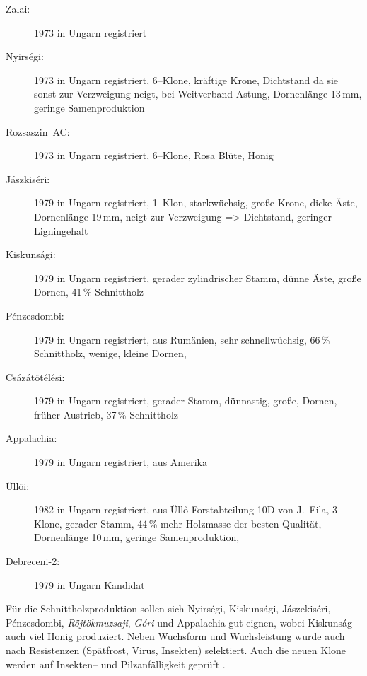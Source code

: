 \documentclass[twocolumn]{scrartcl}
\begin{document}
\begin{description}
  \item[Zalai:] 1973 in Ungarn registriert \citep{keresztesi1983robinie}
  \item[Nyirségi:] 1973 in Ungarn registriert, 6--Klone, kräftige Krone, Dichtstand da sie sonst zur Verzweigung neigt, bei Weitverband Astung, Dornenlänge 13\,mm, geringe Samenproduktion \citep{keresztesi1983robinie,kapusi1995robinie,abri2024dis}
  \item[Rozsaszin~AC:] 1973 in Ungarn registriert, 6--Klone, Rosa Blüte, Honig \citep{keresztesi1983robinie,kapusi1995robinie}
  \item[Jászkiséri:] 1979 in Ungarn registriert, 1--Klon, starkwüchsig, große Krone, dicke Äste, Dornenlänge 19\,mm, neigt zur Verzweigung => Dichtstand, geringer Ligningehalt \citep{keresztesi1983robinie,zsombor1980robinie,kapusi1995robinie,abri2024dis}
  \item[Kiskunsági:] 1979 in Ungarn registriert, gerader zylindrischer Stamm, dünne Äste, große Dornen, 41\,\% Schnittholz \citep{keresztesi1983robinie,zsombor1980robinie}
  \item[Pénzesdombi:] 1979 in Ungarn registriert, aus Rumänien, sehr schnellwüchsig, 66\,\% Schnittholz, wenige, kleine Dornen, \citet{zsombor1980robinie}
  \item[Csázátötélési:] 1979 in Ungarn registriert, gerader Stamm, dünnastig, große, Dornen, früher Austrieb, 37\,\% Schnittholz \citep{zsombor1980robinie}
  \item[Appalachia:] 1979 in Ungarn registriert, aus Amerika
  \item[Üllöi:] 1982 in Ungarn registriert, aus Üllő Forstabteilung 10D von J.~Fila, 3--Klone, gerader Stamm, 44\,\% mehr Holzmasse der besten Qualität, Dornenlänge 10\,mm, geringe Samenproduktion, \citep{bach1983robinie,kapusi1995robinie,abri2024dis,redei2020ulloi}
  \item[Debreceni-2:] 1979 in Ungarn Kandidat \citep{keresztesi1983robinie}
\end{description}

Für die Schnittholzproduktion sollen sich Nyirségi, Kiskunsági,
Jászekiséri, Pénzesdombi, \emph{Röjtökmuzsaji}, \emph{Góri} und
Appalachia gut eignen, wobei Kiskunság auch viel Honig
produziert. Neben Wuchsform und Wuchsleistung wurde auch nach
Resistenzen (Spätfrost, Virus, Insekten) selektiert.  Auch die neuen
Klone werden auf Insekten-- und Pilzanfälligkeit geprüft
\citep{abri2024robinieResistenz}.
\end{document}
